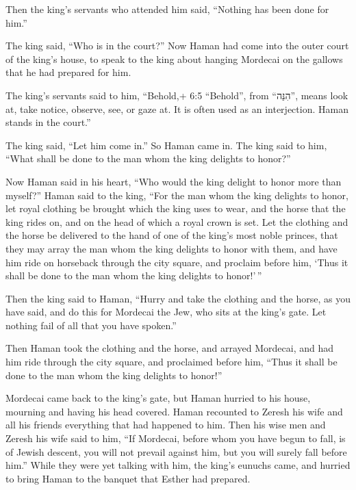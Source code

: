 Then the king's servants who attended him said, ``Nothing has been done
for him.''

 The king said, ``Who is in the court?'' Now Haman had come
into the outer court of the king's house, to speak to the king about
hanging Mordecai on the gallows that he had prepared for him.

 The king's servants said to him, ``Behold,+ 6:5 ``Behold'',
from ``הִנֵּה'', means look at, take notice, observe, see, or gaze at.
It is often used as an interjection. Haman stands in the court.''

The king said, ``Let him come in.''  So Haman came in. The
king said to him, ``What shall be done to the man whom the king delights
to honor?''

Now Haman said in his heart, ``Who would the king delight to honor more
than myself?''  Haman said to the king, ``For the man whom
the king delights to honor,  let royal clothing be brought
which the king uses to wear, and the horse that the king rides on, and
on the head of which a royal crown is set.  Let the clothing
and the horse be delivered to the hand of one of the king's most noble
princes, that they may array the man whom the king delights to honor
with them, and have him ride on horseback through the city square, and
proclaim before him, `Thus it shall be done to the man whom the king
delights to honor!'\,''

 Then the king said to Haman, ``Hurry and take the clothing
and the horse, as you have said, and do this for Mordecai the Jew, who
sits at the king's gate. Let nothing fail of all that you have spoken.''

 Then Haman took the clothing and the horse, and arrayed
Mordecai, and had him ride through the city square, and proclaimed
before him, ``Thus it shall be done to the man whom the king delights to
honor!''

 Mordecai came back to the king's gate, but Haman hurried
to his house, mourning and having his head covered.  Haman
recounted to Zeresh his wife and all his friends everything that had
happened to him. Then his wise men and Zeresh his wife said to him, ``If
Mordecai, before whom you have begun to fall, is of Jewish descent, you
will not prevail against him, but you will surely fall before him.''
 While they were yet talking with him, the king's eunuchs
came, and hurried to bring Haman to the banquet that Esther had
prepared.

